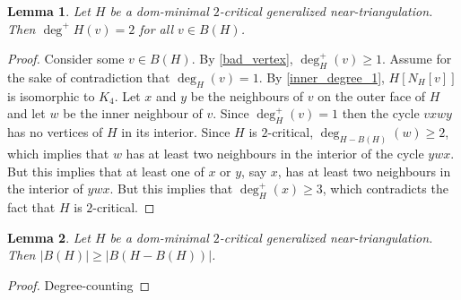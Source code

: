 \documentclass[12pt]{article}
\newtheorem{obs}{Observation}
\newtheorem{lem}{Lemma}
\theoremstyle{definition}
\begin{document}
\begin{lem}
  Let $H$ be a dom-minimal $2$-critical generalized near-triangulation.  Then $\deg^+H(v)=2$ for all $v\in B(H)$.
\end{lem}

\begin{proof}
  Consider some $v\in B(H)$. By \cref{bad_vertex}, $\deg^+_H(v)\ge 1$. Assume for the sake of contradiction that $\deg_H(v)=1$. By \cref{inner_degree_1}, $H[N_H[v]]$ is isomorphic to $K_4$. Let $x$ and $y$ be the neighbours of $v$ on the outer face of $H$ and let $w$ be the inner neighbour of $v$. Since $\deg^+_H(v)=1$ then the cycle $vxwy$ has no vertices of $H$ in its interior.  Since $H$ is $2$-critical, $\deg_{H-B(H)}(w)\ge 2$, which implies that $w$ has at least two neighbours in the interior of the cycle $ywx$.  But this implies that at least one of $x$ or $y$, say $x$, has at least two neighbours in the interior of $ywx$.  But this implies that $\deg^+_H(x)\ge 3$, which contradicts the fact that $H$ is $2$-critical.
\end{proof}


\begin{lem}
  Let $H$ be a dom-minimal $2$-critical generalized near-triangulation.  Then $|B(H)|\ge |B(H-B(H))|$.
\end{lem}

\begin{proof}
  Degree-counting
\end{proof}


%


%
%

%
\end{document}
